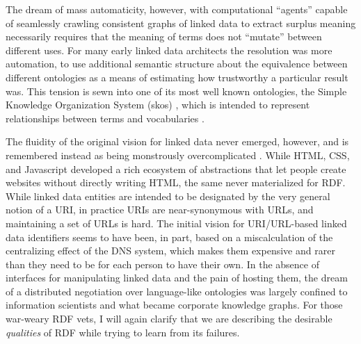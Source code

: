 The dream of mass automaticity, however, with computational ``agents''
capable of seamlessly crawling consistent graphs of linked data to
extract surplus meaning necessarily requires that the meaning of terms
does not ``mutate'' between different uses. For many early linked data
architects the resolution was more automation, to use additional
semantic structure about the equivalence between different ontologies as
a means of estimating how trustworthy a particular result was. This
tension is sewn into one of its most well known ontologies, the Simple
Knowledge Organization System (skos) \citep{brickleySKOSCoreGuide2005} , which is intended to represent relationships between terms and
vocabularies \citep{milesQuickGuidePublishing2005} .

The fluidity of the original vision for linked data never emerged,
however, and is remembered instead as being monstrously overcomplicated
\citep{palmerDitchingSemanticWeb2008, librariaStoningGoliath2022} .
While HTML, CSS, and Javascript developed a rich ecosystem of
abstractions that let people create websites without directly writing
HTML, the same never materialized for RDF. While linked data entities
are intended to be designated by the very general notion of a URI, in
practice URIs are near-synonymous with URLs, and maintaining a set of
URLs is hard. The initial vision for URI/URL-based linked data identifiers seems to have been, in part, based on a miscalculation of the centralizing effect of the DNS system, which makes them expensive and rarer than they need to be for each person to have their own. In the absence of interfaces for manipulating linked data
and the pain of hosting them, the dream of a distributed negotiation
over language-like ontologies was largely confined to information
scientists and what became corporate knowledge graphs. For those
war-weary RDF vets, I will again clarify that we are describing the
desirable \emph{qualities} of RDF while trying to learn from its
failures.

